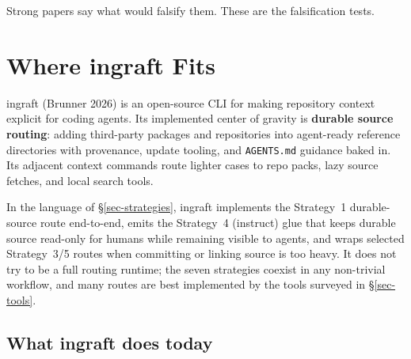 \documentclass[
  11pt,
  letterpaper,
  numbers=noendperiod,
  parskip=half]{scrartcl}
\begin{document}
Strong papers say what would falsify them. These are the falsification
tests.

\fi

\section{Where ingraft Fits}\label{sec-ingraft}

ingraft (Brunner 2026) is an open-source CLI for making repository
context explicit for coding agents. Its implemented center of gravity is
\textbf{durable source routing}: adding third-party packages and
repositories into agent-ready reference directories with provenance,
update tooling, and \texttt{AGENTS.md} guidance baked in. Its adjacent
context commands route lighter cases to repo packs, lazy source fetches,
and local search tools.

In the language of \S\ref{sec-strategies}, ingraft implements the
Strategy~1 durable-source route end-to-end, emits the Strategy~4
(instruct) glue that keeps durable source read-only for humans while
remaining visible to agents, and wraps selected Strategy~3/5 routes when
committing or linking source is too heavy. It does not try to be a full routing runtime; the seven
strategies coexist in any non-trivial workflow, and many routes are best
implemented by the tools surveyed in \S\ref{sec-tools}.

\subsection*{What ingraft does today}
\end{document}
